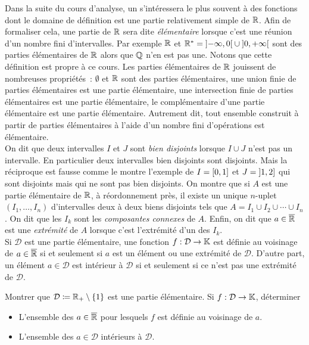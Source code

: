 \documentclass{magnolia}
\begin{document}
Dans la suite du cours d'analyse, un s'intéressera le plus souvent à des fonctions dont
le domaine de définition est une partie relativement simple de $\mathbb{R}$. Afin de formaliser cela,
une partie de $\mathbb{R}$ sera dite \emph{élémentaire} lorsque c'est une réunion d'un nombre fini
d'intervalles. Par exemple $\mathbb{R}$ et ${\mathbb{R}^*}=\left]-\infty,0\right[\cup\left]0,+\infty\right[$ sont des parties élémentaires
de $\mathbb{R}$ alors que $\mathbb{Q}$ n'en est pas une. Notons que cette définition est propre à ce cours.
Les parties élémentaires de $\mathbb{R}$ jouissent de nombreuses propriétés~:
$\emptyset$ et $\mathbb{R}$ sont des parties élémentaires,
une union finie de parties élémentaires est une partie élémentaire,
une intersection finie de parties élémentaires est une partie élémentaire,
le complémentaire d'une partie élémentaire est une partie élémentaire.
Autrement dit, tout ensemble construit à partir de parties élémentaires à l'aide d'un nombre
fini d'opérations est élémentaire.\\

On dit que deux intervalles $I$ et $J$ sont \emph{bien disjoints} lorsque $I\cup J$ n'est
pas un intervalle. En particulier deux intervalles bien disjoints sont disjoints. Mais
la réciproque est fausse comme le montre l'exemple de $I=\left[0,1\right]$ et
$J=\left]1,2\right]$ qui sont disjoints mais qui ne sont pas bien disjoints.
On montre
que si $A$ est une partie élémentaire de $\mathbb{R}$, à réordonnement près, il existe un unique
$n$-uplet $(I_1,\ldots,I_n)$ d'intervalles deux à deux biens disjoints tels que
$A=I_1\cup I_2\cup\cdots\cup I_n$. On dit que les $I_k$ sont les
\emph{composantes connexes} de $A$. Enfin, on dit que $a\in\overline{\mathbb{R}}$ est
une \emph{extrémité} de $A$ lorsque c'est l'extrémité d'un des $I_k$.\\

Si $\mathcal{D}$ est une partie élémentaire, une fonction $f:\mathcal{D}\to\mathbb{K}$ 
  est définie au voisinage de $a\in\overline{\mathbb{R}}$ si et seulement si $a$ est un élément
  ou une extrémité de $\mathcal{D}$.
  D'autre part, un élément $a\in\mathcal{D}$ est intérieur à
  $\mathcal{D}$ si et seulement si ce n'est pas
  une extrémité de $\mathcal{D}$.\\
  
\begin{exoUnique}
\exo Montrer que $\mathcal{D}\coloneqq\mathbb{R}_+\setminus\left\{1\right\}$ est une partie élémentaire. Si
  $f:\mathcal{D}\to\mathbb{K}$, déterminer
  \begin{itemize}
  \item L'ensemble des $a\in\overline{\mathbb{R}}$ pour lesquels $f$ est définie au voisinage de $a$.
  \item L'ensemble des $a\in\mathcal{D}$ intérieurs à $\mathcal{D}$.
  \end{itemize}
\end{exoUnique}
\end{document}
